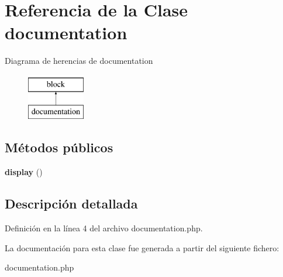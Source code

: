 \hypertarget{classdocumentation}{\section{\-Referencia de la \-Clase documentation}
\label{classdocumentation}
}
\-Diagrama de herencias de documentation\begin{figure}[H]
\begin{center}
\leavevmode
\includegraphics[height=2.000000cm]{classdocumentation}
\end{center}
\end{figure}
\subsection*{\-Métodos públicos}
\begin{DoxyCompactItemize}
\item 
\hypertarget{classdocumentation_a57d71d7b60444440fa1a4aba1135a751}{{\bfseries display} ()}\label{classdocumentation_a57d71d7b60444440fa1a4aba1135a751}

\end{DoxyCompactItemize}


\subsection{\-Descripción detallada}


\-Definición en la línea 4 del archivo documentation.\-php.



\-La documentación para esta clase fue generada a partir del siguiente fichero\-:\begin{DoxyCompactItemize}
\item 
documentation.\-php\end{DoxyCompactItemize}
